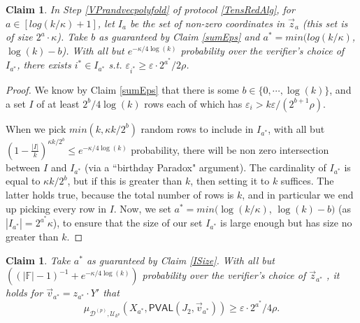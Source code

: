 \documentclass[10pt,a4paper]{article}
\newtheorem{claim}[theorem]{Claim}
\newcommand{\PVAL}{\mathsf{PVAL}}
\newcommand{\F}{\mathbb{F}}
\begin{document}
\begingroup
\def\thetheorem{\ref{ISize}}
\begin{claim}
In Step \ref{VPrandvecpolyfold} of protocol \ref{TensRedAlg}, for $a \in [log(k/\kappa) + 1]$, let $I_{a}$ be the set of non-zero coordinates in $\vec{z}_{a}$ (this set is of size $2^{a}\cdot \kappa$). Take $b$ as guaranteed by Claim \ref{sumEps} and $a^{\ast} = min(log(k/\kappa)$, $\log (k) - b$). With all but $e^{-\kappa/4 \log (k)}$ probability over the verifier’s choice of $I_{a^{\ast}}$, there exists $i^{\ast} \in I_{a^{\ast}}$ s.t. $\varepsilon_{i^{\ast}} \geq \varepsilon \cdot 2^{a^{\ast}}/2\rho$.
\end{claim}
\addtocounter{theorem}{-1}
\endgroup
\begin{proof}
We know by Claim \ref{sumEps} that there is some $b\in\{0,\cdots, \log (k)\}$, and a set $I$ of at least $2^{b}/4 \log (k)$ rows each of which has $\varepsilon_{i}>k\varepsilon/(2^{b+1}\rho)$.

When we pick $min(k, \kappa k/2^{b})$ random rows to include in $I_{a^{\ast}}$, with all but $\left( 1-\frac{\vert I\vert }{k} \right)^{\kappa k/2^{b}}\leq e^{-\kappa/4\log (k)}$ probability, there will be non zero intersection between $I$ and $I_{a^{\ast}}$ (via a ``birthday Paradox" argument). The cardinality of $I_{a^{\ast}}$ is equal to $\kappa k/2^{b}$, but if this is greater than $k$, then setting it to $k$ suffices. The latter holds true, because the total number of rows is $k$, and in particular we end up picking every row in $I$. Now, we set $a^{\ast} = min(\log(k/\kappa)$, $\log (k) - b)$ (as $|I_{a^{\ast}}|=2^{a^{\ast}}\kappa$), to ensure that the size of our set $I_{a^{\ast}}$ is large enough but has size no greater than $k$.
\end{proof}
\begingroup
\def\thetheorem{\ref{TensRedSound}}
\begin{claim}
Take $a^{\ast}$ as guaranteed by Claim \ref{ISize}. With all but $((\vert \F\vert -1)^{-1}+e^{-\kappa/4 \log (k)} )$ probability over the verifier’s choice of $\vec{z}_{a^{\ast}}$ , it holds for $\vec{v}_{a^{\ast}}=z_{a^{\ast}}\cdot Y'$ that 
\begin{equation*}
    \mu_{\mathcal{D}^{(p)},\mathcal{U}_{k^{p}}}(X_{a^{\ast}},\PVAL(J_{2},\vec{v}_{a^{\ast}}))\geq \varepsilon\cdot2^{a^{\ast}}/4\rho.
\end{equation*}
\end{claim}
\addtocounter{theorem}{-1}
\endgroup
\end{document}
